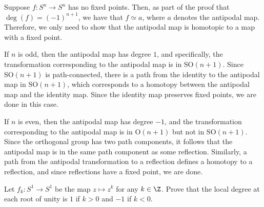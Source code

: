 \documentclass[10pt]{mypackage}
\begin{document}
\begin{solution}
  Suppose $f\colon S^n\rightarrow S^n$ has no fixed points. Then, as part of the proof that $\deg\left( f \right) = \left( -1 \right)^{n+1}$, we have that $f\simeq a$, where $a$ denotes the antipodal map. Therefore, we only need to show that the antipodal map is homotopic to a map with a fixed point.

  If $n$ is odd, then the antipodal map has degree $1$, and specifically, the transformation corresponding to the antipodal map is in $ \text{SO}(n+1) $. Since $\text{SO}(n+1)$ is path-connected, there is a path from the identity to the antipodal map in $\text{SO}(n+1)$, which corresponds to a homotopy between the antipodal map and the identity map. Since the identity map preserves fixed points, we are done in this case.

  If $n$ is even, then the antipodal map has degree $-1$, and the transformation corresponding to the antipodal map is in $\text{O}\left( n+1 \right)$ but not in $\text{SO}\left( n+1 \right)$. Since the orthogonal group has two path components, it follows that the antipodal map is in the same path component as some reflection. Similarly, a path from the antipodal transformation to a reflection defines a homotopy to a reflection, and since reflections have a fixed point, we are done.
\end{solution}
\begin{problem}[Problem 3]
  Let $f_k\colon S^1\rightarrow S^1$ be the map $z\mapsto z^{k}$ for any $k\in \Z$. Prove that the local degree at each root of unity is $1$ if $k > 0$ and $-1$ if $k < 0$.
\end{problem}
\end{document}
